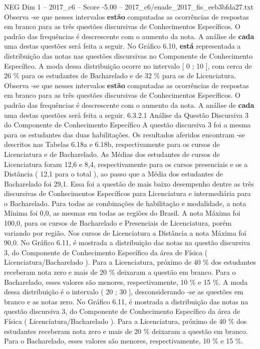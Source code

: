 \begin{textsample}{NEG Dim 1 – 2017\_c6 – Score -5.00 – 2017\_c6/enade\_2017\_fis\_eeb3bfda27.txt}
Observa -se que nesses intervalos \textbf{estão} computadas as ocorrências de respostas em branco para as três questões discursivas de Conhecimentos Específicos.
O padrão das frequências é descrescente com o aumento da nota.
A análise de \textbf{cada} uma destas questões será feita a seguir.
No Gráfico 6.10, \textbf{está} representada a distribuição das notas nas questões discursivas no Componente de Conhecimento Específico.
A moda dessa distribuição ocorre no intervalo [ 0 ; 10 ], com cerca de 26 \% para os estudantes de Bacharelado e de 32 \% para os de Licenciatura.
Observa -se que nesses intervalos \textbf{estão} computadas as ocorrências de respostas em branco para as três questões discursivas de Conhecimentos Específicos.
O padrão das frequências é descrescente com o aumento da nota.
A análise de \textbf{cada} uma destas questões será feita a seguir. 6.3.2.1 Análise da Questão Discursiva 3 do Componente de Conhecimento Específico A questão discursiva 3 foi a mesma para os estudantes das duas habilitações.
Os resultados aferidos encontram -se descritos nas Tabelas 6.18a e 6.18b, respectivamente para os cursos de Licenciatura e de Bacharelado.
As Médias dos estudantes de cursos de Licenciatura foram 12,6 e 8,4, respectivamente para os cursos presenciais e os a Distância ( 12,1 para o total ), ao passo que a Média dos estudantes de Bacharelado foi 29,1.
Essa foi a questão de mais baixo desempenho dentre as três discursivas de Conhecimentos Específicos para Licenciatura e intermediária para o Bacharelado.
Para todas as combinações de habilitação e modalidade, a nota Mínima foi 0,0, as mesmas em todas as regiões do Brasil.
A nota Máxima foi 100,0, para os cursos de Bacharelado e Presenciais de Licenciatura, porém variando por região.
Nos cursos de Licenciatura a Distância a nota Máxima foi 90,0.
No Gráfico 6.11, é mostrada a distribuição das notas na questão discursiva 3, do Componente de Conhecimento Específico da área de Física ( Licenciatura/Bacharelado ).
Para a Licenciatura, próximo de 40 \% dos estudantes receberam nota zero e mais de 20 \% deixaram a questão em branco.
Para o Bacharelado, esses valores são menores, respectivamente, 10 \% e 15 \%.
A moda dessa distribuição é o intervalo ( 20 ; 30 ], desconsiderando -se as questões em branco e as notas zero.
No Gráfico 6.11, é mostrada a distribuição das notas na questão discursiva 3, do Componente de Conhecimento Específico da área de Física ( Licenciatura/Bacharelado ).
Para a Licenciatura, próximo de 40 \% dos estudantes receberam nota zero e mais de 20 \% deixaram a questão em branco.
Para o Bacharelado, esses valores são menores, respectivamente, 10 \% e 15 \%.

\end{textsample}
